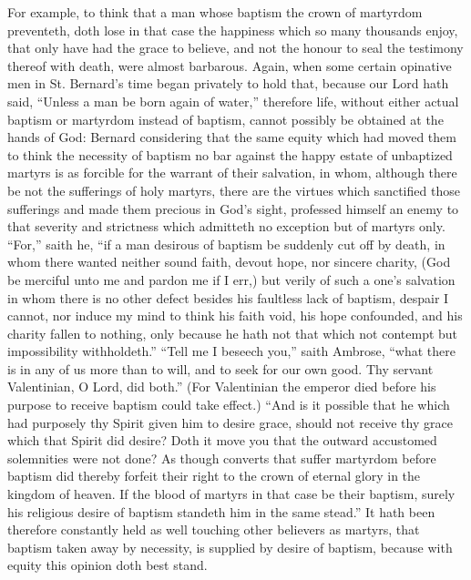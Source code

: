 For example, to think that a man whose baptism the crown of martyrdom preventeth, doth lose in that case the happiness which so many thousands enjoy, that only have had the grace to believe, and not the honour to seal the testimony thereof with death, were almost barbarous.
Again, when some certain opinative men in St. Bernard’s time began privately to hold that, because our Lord hath said, “Unless a man be born again of water,” therefore life, without either actual baptism or martyrdom instead of baptism, cannot possibly be obtained at the hands of God: Bernard considering that the same equity which had moved them to think the necessity of baptism no bar against the happy estate of unbaptized martyrs is as forcible for the warrant of their salvation, in whom, although there be not the sufferings of holy martyrs, there are the virtues which sanctified those sufferings and made them precious in God’s sight, professed himself an enemy to that severity and strictness which admitteth no exception but of martyrs only. “For,” saith he,  “if a man desirous of baptism be suddenly cut off by death, in whom there wanted neither sound faith, devout hope, nor sincere charity, (God be merciful unto me and pardon me if I err,) but verily of such a one’s salvation in whom there is no other defect besides his faultless lack of baptism, despair I cannot, nor induce my mind to think his faith void, his hope confounded, and his charity fallen to nothing, only because he hath not that which not contempt but impossibility withholdeth.”
“Tell me I beseech you,” saith Ambrose, “what there is in any of us more than to will, and to seek for our own good. Thy servant Valentinian, O Lord, did both.” (For Valentinian the emperor died before his purpose to receive baptism could take effect.) “And is it possible that he which had purposely thy Spirit given him to desire grace, should not receive thy grace which that Spirit did desire? Doth it move you that the outward accustomed solemnities were not done? As though converts that suffer martyrdom before baptism did thereby forfeit their right to the crown of eternal glory in the kingdom of heaven. If the blood of martyrs in that case be their baptism, surely his religious desire of baptism standeth him in the same stead.”
It hath been therefore constantly held as well touching other believers as martyrs, that baptism taken away by necessity, is supplied by desire of baptism, because with equity this opinion doth best stand.
